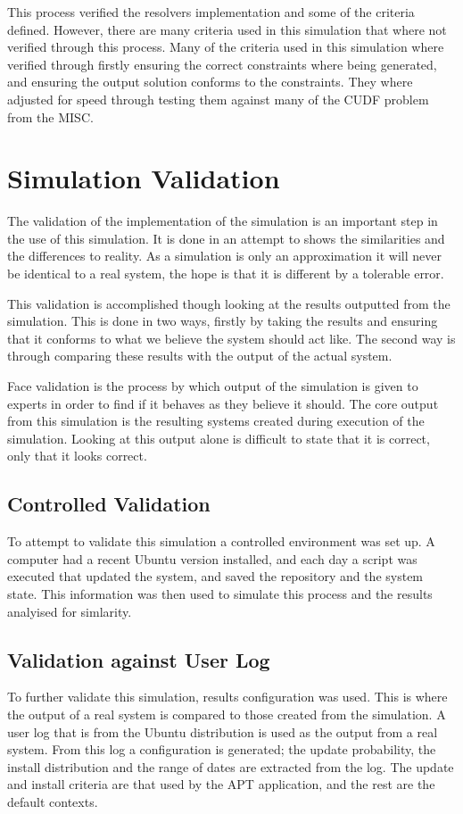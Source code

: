 This process verified the resolvers implementation and some of the criteria defined.
However, there are many criteria used in this simulation that where not verified through this process.
Many of the criteria used in this simulation where verified through firstly ensuring the correct constraints where being generated, 
and ensuring the output solution conforms to the constraints.
They where adjusted for speed through testing them against many of the CUDF problem from the MISC.

\section{Simulation Validation}
The validation of the implementation of the simulation is an important step in the use of this simulation.
It is done in an attempt to shows the similarities and the differences to reality.
As a simulation is only an approximation it will never be identical to a real system, the hope is that it is different by a tolerable error. 

This validation is accomplished though looking at the results outputted from the simulation.
This is done in two ways, firstly by taking the results and ensuring that it conforms to what we believe the system should act like.
The second way is through comparing these results with the output of the actual system.

Face validation is the process by which output of the simulation is given to experts in order to find if it behaves as they believe it should.
The core output from this simulation is the resulting systems created during execution of the simulation.
Looking at this output alone is difficult to state that it is correct, only that it looks correct.

\subsection{Controlled Validation}
To attempt to validate this simulation a controlled environment was set up. 
A computer had a recent Ubuntu version installed, and each day a script was executed that updated the system, and saved the repository and the system state.
This information was then used to simulate this process and the results analyised for simlarity.

\subsection{Validation against User Log}
To further validate this simulation, results configuration was used.
This is where the output of a real system is compared to those created from the simulation.
A user log that is from the Ubuntu distribution is used as the output from a real system. 
From this log a configuration is generated; the update probability, the install distribution and the range of dates are extracted from the log.
The update and install criteria are that used by the APT application, and the rest are the default contexts.  


